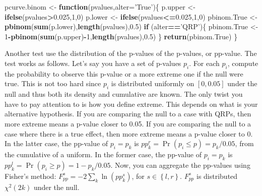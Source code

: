 \documentclass[]{book}
\newenvironment{Shaded}{\begin{snugshade}}{\end{snugshade}}
\newcommand{\ControlFlowTok}[1]{\textcolor[rgb]{0.13,0.29,0.53}{\textbf{#1}}}
\newcommand{\DataTypeTok}[1]{\textcolor[rgb]{0.13,0.29,0.53}{#1}}
\newcommand{\DecValTok}[1]{\textcolor[rgb]{0.00,0.00,0.81}{#1}}
\newcommand{\FloatTok}[1]{\textcolor[rgb]{0.00,0.00,0.81}{#1}}
\newcommand{\KeywordTok}[1]{\textcolor[rgb]{0.13,0.29,0.53}{\textbf{#1}}}
\newcommand{\NormalTok}[1]{#1}
\newcommand{\OperatorTok}[1]{\textcolor[rgb]{0.81,0.36,0.00}{\textbf{#1}}}
\newcommand{\StringTok}[1]{\textcolor[rgb]{0.31,0.60,0.02}{#1}}
\theoremstyle{definition}
\theoremstyle{definition}
\theoremstyle{definition}
\theoremstyle{remark}
\begin{document}
\begin{Shaded}
\begin{Highlighting}[]
\NormalTok{pcurve.binom <-}\StringTok{ }\ControlFlowTok{function}\NormalTok{(pvalues,}\DataTypeTok{alter=}\StringTok{'True'}\NormalTok{)\{}
\NormalTok{  p.upper <-}\StringTok{ }\KeywordTok{ifelse}\NormalTok{(pvalues}\OperatorTok{>}\FloatTok{0.025}\NormalTok{,}\DecValTok{1}\NormalTok{,}\DecValTok{0}\NormalTok{)}
\NormalTok{  p.lower <-}\StringTok{ }\KeywordTok{ifelse}\NormalTok{(pvalues}\OperatorTok{<=}\FloatTok{0.025}\NormalTok{,}\DecValTok{1}\NormalTok{,}\DecValTok{0}\NormalTok{)}
\NormalTok{  pbinom.True <-}\StringTok{ }\KeywordTok{pbinom}\NormalTok{(}\KeywordTok{sum}\NormalTok{(p.lower),}\KeywordTok{length}\NormalTok{(pvalues),}\FloatTok{0.5}\NormalTok{)}
  \ControlFlowTok{if}\NormalTok{ (alter}\OperatorTok{==}\StringTok{'QRP'}\NormalTok{)\{}
\NormalTok{    pbinom.True <-}\StringTok{ }\DecValTok{1}\OperatorTok{-}\KeywordTok{pbinom}\NormalTok{(}\KeywordTok{sum}\NormalTok{(p.upper)}\OperatorTok{-}\DecValTok{1}\NormalTok{,}\KeywordTok{length}\NormalTok{(pvalues),}\FloatTok{0.5}\NormalTok{)}
\NormalTok{  \}}
  \KeywordTok{return}\NormalTok{(pbinom.True)}
\NormalTok{\}}
\end{Highlighting}
\end{Shaded}

Another test use the distribution of the p-values of the p-values, or pp-value.
The test works as follows.
Let's say you have a set of p-values \(p_i\).
For each \(p_i\), compute the probability to observe this p-value or a more extreme one if the null were true.
This is not too hard since \(p_i\) is distributed uniformly on \(\left[0,0.05\right]\) under the null and thus both its density and cumulative are known.
The only twist you have to pay attention to is how you define extreme.
This depends on what is your alternative hypothesis.
If you are comparing the null to a case with QRPs, then more extreme means a p-value closer to 0.05.
If you are comparing the null to a case where there is a true effect, then more extreme means a p-value closer to 0.
In the latter case, the pp-value of \(p_i=p_k\) is \(pp^r_k=\Pr(p_i\leq p)=p_k/0.05\), from the cumulative of a uniform.
In the former case, the pp-value of \(p_i=p_k\) is \(pp^l_k=\Pr(p_i\geq p)=1-p_k/0.05\).
Now, you can aggregate the pp-values using Fisher's method: \(F_{pp}^s=-2\sum_k\ln(pp^s_k)\), for \(s\in\left\{l,r\right\}\).
\(F_{pp}^s\) is distributed \(\chi^2(2k)\) under the null.
\end{document}
